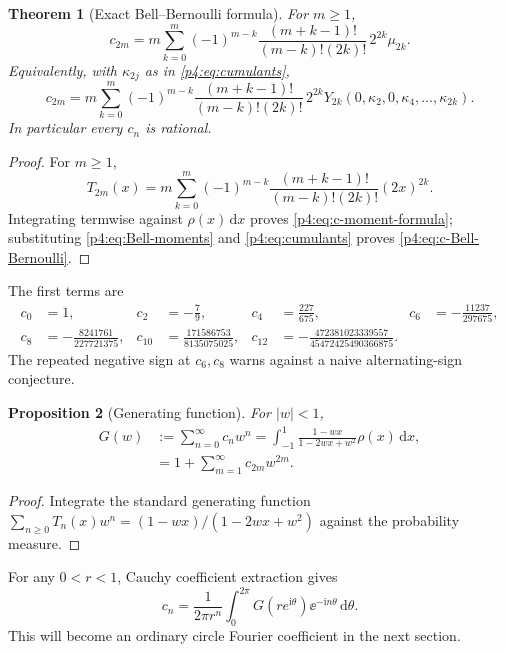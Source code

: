 \documentclass[11pt,oneside]{article}
\newtheorem{theorem}{Theorem}[section]
\newtheorem{proposition}[theorem]{Proposition}
\theoremstyle{definition}
\newcommand{\dd}{\,\mathrm d}
\newcommand{\ii}{\mathrm i}
\begin{document}
\begin{theorem}[Exact Bell--Bernoulli formula]
\label{p4:thm:c-exact}
For \(m\ge1\),
\begin{equation}
 c_{2m}=m\sum_{k=0}^{m}(-1)^{m-k}
 \frac{(m+k-1)!}{(m-k)!(2k)!}\,2^{2k}\mu_{2k}.
 \label{p4:eq:c-moment-formula}
\end{equation}
Equivalently, with \(\kappa_{2j}\) as in \eqref{p4:eq:cumulants},
\begin{equation}
 c_{2m}=m\sum_{k=0}^{m}(-1)^{m-k}
 \frac{(m+k-1)!}{(m-k)!(2k)!}\,2^{2k}
 Y_{2k}(0,\kappa_2,0,\kappa_4,\ldots,\kappa_{2k}).
 \label{p4:eq:c-Bell-Bernoulli}
\end{equation}
In particular every \(c_n\) is rational.
\end{theorem}

\begin{proof}
For \(m\ge1\),
\[
 T_{2m}(x)=m\sum_{k=0}^{m}(-1)^{m-k}
 \frac{(m+k-1)!}{(m-k)!(2k)!}(2x)^{2k}.
\]
Integrating termwise against \(\rho(x)\dd x\) proves \eqref{p4:eq:c-moment-formula}; substituting
\eqref{p4:eq:Bell-moments} and \eqref{p4:eq:cumulants} proves \eqref{p4:eq:c-Bell-Bernoulli}.
\end{proof}

The first terms are
\begin{align*}
 c_0&=1,&c_2&=-\frac79,&c_4&=\frac{227}{675},&c_6&=-\frac{11237}{297675},\\
 c_8&=-\frac{8241761}{227721375},&
 c_{10}&=\frac{171586753}{8135075025},&
 c_{12}&=-\frac{472381023339557}{45472425490366875}.
\end{align*}
The repeated negative sign at \(c_6,c_8\) warns against a naive alternating-sign conjecture.

\begin{proposition}[Generating function]
\label{p4:prop:G-cheb}
For \(|w|<1\),
\begin{align}
 G(w)&:=\sum_{n=0}^{\infty}c_nw^n
 =\int_{-1}^{1}\frac{1-wx}{1-2wx+w^2}\rho(x)\dd x,
 \label{p4:eq:G-cheb}\\
 &=1+\sum_{m=1}^{\infty}c_{2m}w^{2m}.
 \label{p4:eq:G-even}
\end{align}
\end{proposition}

\begin{proof}
Integrate the standard generating function
\(\sum_{n\ge0}T_n(x)w^n=(1-wx)/(1-2wx+w^2)\) against the probability measure.
\end{proof}

For any \(0<r<1\), Cauchy coefficient extraction gives
\begin{equation}
 c_n=\frac{1}{2\pi r^n}\int_0^{2\pi}G(re^{\ii\theta})
 \ee^{-\ii n\theta}\dd\theta.
 \label{p4:eq:c-Cauchy-coefficient}
\end{equation}
This will become an ordinary circle Fourier coefficient in the next section.
\end{document}
